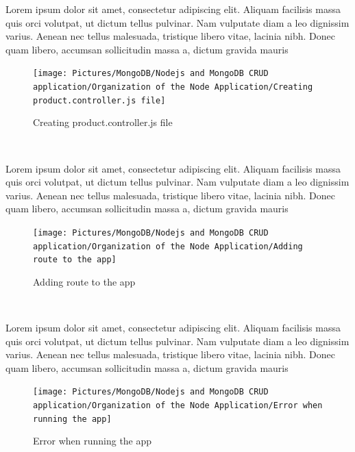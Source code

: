 \begin{spacing}{1.2}
\par Lorem ipsum dolor sit amet, consectetur adipiscing elit. Aliquam facilisis massa quis orci volutpat, ut dictum tellus pulvinar. Nam vulputate diam a leo dignissim varius. Aenean nec tellus malesuada, tristique libero vitae, lacinia nibh. Donec quam libero, accumsan sollicitudin massa a, dictum gravida mauris
\\
\begin{figure}[!htb] 
\begin{center} 
\texttt{[image: Pictures/MongoDB/Nodejs and MongoDB CRUD  application/Organization of the Node Application/Creating product.controller.js file]} 
\end{center} 
\caption{Creating product.controller.js file} 
\end{figure}  \FloatBarrier
\\

\par Lorem ipsum dolor sit amet, consectetur adipiscing elit. Aliquam facilisis massa quis orci volutpat, ut dictum tellus pulvinar. Nam vulputate diam a leo dignissim varius. Aenean nec tellus malesuada, tristique libero vitae, lacinia nibh. Donec quam libero, accumsan sollicitudin massa a, dictum gravida mauris
\\
\begin{figure}[!htb] 
\begin{center} 
\texttt{[image: Pictures/MongoDB/Nodejs and MongoDB CRUD  application/Organization of the Node Application/Adding route to the app]} 
\end{center} 
\caption{Adding route to the app} 
\end{figure}  \FloatBarrier
\\

\par Lorem ipsum dolor sit amet, consectetur adipiscing elit. Aliquam facilisis massa quis orci volutpat, ut dictum tellus pulvinar. Nam vulputate diam a leo dignissim varius. Aenean nec tellus malesuada, tristique libero vitae, lacinia nibh. Donec quam libero, accumsan sollicitudin massa a, dictum gravida mauris
\\
\begin{figure}[!htb] 
\begin{center} 
\texttt{[image: Pictures/MongoDB/Nodejs and MongoDB CRUD  application/Organization of the Node Application/Error when running the app]} 
\end{center} 
\caption{Error when running the app} 
\end{figure}  \FloatBarrier
\\


\end{spacing}
